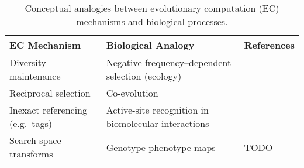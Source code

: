 \begin{table*}
\centering
\caption{Conceptual analogies between evolutionary computation (EC) mechanisms and biological processes.}
\label{tab:bioinspiration}
\renewcommand{\arraystretch}{1.6} %
\begin{tabular}{@{}p{4.2cm}p{4.2cm}p{6.5cm}@{}}
\toprule
\textbf{EC Mechanism} & \textbf{Biological Analogy} & \textbf{References} \\
\midrule
Diversity maintenance & Negative frequency--dependent selection (ecology) & \citep{dolson2018ecological,dolson2018applying} \\
Reciprocal selection & Co-evolution & \citep{lehman2010efficiently,harper2012spatial,garbus2024accelerating,koza1991genetic,kala2012multi,wang2019poet,miikkulainen2024evolving} \\
Inexact referencing (e.g.\ tags) & Active-site recognition in biomolecular interactions & \citep{spector2011tag,moreno2023matchmaker,lalejini2018signalgp,downing2015intelligence} \\
Search-space transforms & Genotype-phenotype maps & \citep{lehman2023evolution,moreno2018learning,bentley2022evolving,gaier2020discovering,wittenberg2023denoising} TODO \\
\bottomrule
\end{tabular}
\end{table*}
